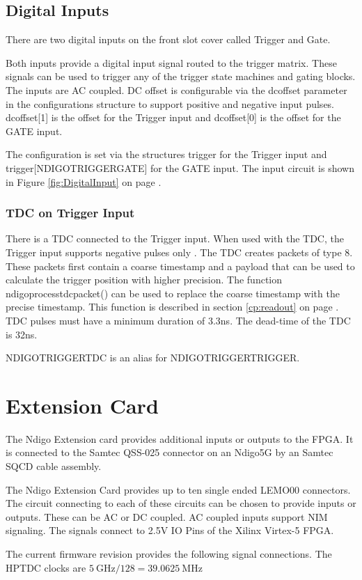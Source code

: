 \subsection{Digital Inputs}
%
There are two digital inputs on the front slot cover called Trigger and Gate.\par
Both inputs provide a digital input signal routed to the trigger matrix. These signals can be used to trigger any of the trigger state machines and gating blocks. The inputs are AC coupled. DC offset is configurable via the \textsf{dc\tu offset} parameter in the configurations structure to support positive and negative input pulses. \textsf{dc\tu offset[1]} is the offset for the Trigger input and \textsf{dc\tu offset[0]} is the offset for the GATE input.\par
The configuration is set via the structures \textsf{trigger} for the Trigger input and \textsf{trigger[NDIGO\tu TRIGGER\tu GATE]} for the GATE input. The input circuit is shown in Figure \ref{fig:DigitalInput} on page \pageref{fig:DigitalInput}.
%
%
%
\subsubsection{TDC on Trigger Input}
%
There is a TDC connected to the Trigger input. When used with the TDC, the Trigger input supports negative pulses only . The TDC creates packets of type 8. These packets first contain a coarse timestamp and a payload that can be used to calculate the trigger position with higher precision. The function \textsf{ndigo\tu process\tu tdc\tu packet()} can be used to replace the coarse timestamp with the precise timestamp. This function is described in section \ref{cp:readout} on page \pageref{cp:readout}.
TDC pulses must have a minimum duration of 3.3ns. The dead-time of the TDC is 32ns.

\textsf{NDIGO\tu TRIGGER\tu TDC} is an alias for \textsf{NDIGO\tu TRIGGER\tu TRIGGER}.
%
%
%
%
%
\section{Extension Card\label{cp:extcard}}

The Ndigo Extension card provides additional inputs or outputs to the FPGA. It is connected to the Samtec QSS-025 connector on an Ndigo5G by an Samtec SQCD cable assembly.\par
The Ndigo Extension Card provides up to ten single ended LEMO00 connectors. The circuit connecting to each of these circuits can be chosen to provide inputs or outputs. These can be AC or DC coupled. AC coupled inputs support NIM signaling. The signals connect to 2.5V IO Pins of the Xilinx Virtex-5 FPGA.\par 
The current firmware revision provides the following signal connections. The HPTDC clocks are $\SI{5}{\giga\hertz} / 128 = \SI{39.0625}{\mega\hertz}$\par
    
